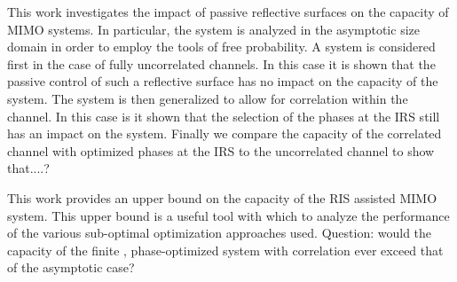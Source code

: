 This work investigates the impact of passive reflective surfaces on the capacity of MIMO systems. In particular, the system is analyzed in the asymptotic size domain in order to employ the tools of free probability.
A system is considered first in the case of fully uncorrelated channels. In this case it is shown that the passive control of such a reflective surface has no impact on the capacity of the system. The system is then generalized to allow for correlation within the channel. In this case is it shown that the selection of the phases at the IRS still has an impact on the system. Finally we compare the capacity of the correlated channel with optimized phases at the IRS to the uncorrelated channel to show that....?

This work provides an upper bound on the capacity of the RIS assisted MIMO system. This upper bound is a useful tool with which to analyze the performance of the various sub-optimal optimization approaches used. 
Question: would the capacity of the finite , phase-optimized system with correlation ever exceed that of the asymptotic case?